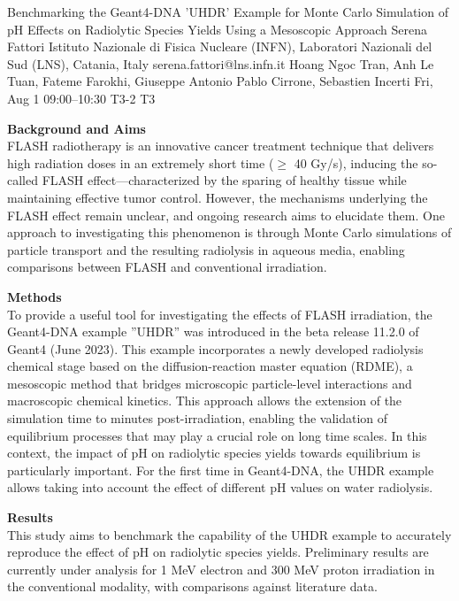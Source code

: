 \begin{talk}
  {Benchmarking the Geant4-DNA 'UHDR' Example for Monte Carlo Simulation of pH Effects on Radiolytic Species Yields Using a Mesoscopic Approach}%
  {Serena Fattori}%
  {Istituto Nazionale di Fisica Nucleare (INFN), Laboratori Nazionali del Sud (LNS), Catania, Italy}%
  {serena.fattori@lns.infn.it}%
  {Hoang Ngoc Tran, Anh Le Tuan, Fateme Farokhi, Giuseppe Antonio Pablo Cirrone, Sebastien Incerti}%
  {}%
  {Fri, Aug 1 09:00–10:30}%
  {T3-2}%
  {T3}%
  
				
			
\textbf{Background and Aims}\\
FLASH radiotherapy is an innovative cancer treatment technique that delivers high radiation doses in an extremely short time ($\geq$ 40 Gy/s), inducing the so-called FLASH effect—characterized by the sparing of healthy tissue while maintaining effective tumor control. However, the mechanisms underlying the FLASH effect remain unclear, and ongoing research aims to elucidate them. One approach to investigating this phenomenon is through Monte Carlo simulations of particle transport and the resulting radiolysis in aqueous media, enabling comparisons between FLASH and conventional irradiation.

\textbf{Methods}\\
To provide a useful tool for investigating the effects of FLASH irradiation, the Geant4-DNA example ''UHDR'' was introduced in the beta release 11.2.0 of Geant4 (June 2023). This example incorporates a newly developed radiolysis chemical stage based on the diffusion-reaction master equation (RDME), a mesoscopic method that bridges microscopic particle-level interactions and macroscopic chemical kinetics. This approach allows the extension of the simulation time to minutes post-irradiation, enabling the validation of equilibrium processes that may play a crucial role on long time scales. In this context, the impact of pH on radiolytic species yields towards equilibrium is particularly important. For the first time in Geant4-DNA, the UHDR example allows taking into account the effect of different pH values on water radiolysis.

\textbf{Results}\\
This study aims to benchmark the capability of the UHDR example to accurately reproduce the effect of pH on radiolytic species yields. Preliminary results are currently under analysis for 1 MeV electron and 300 MeV proton irradiation in the conventional modality, with comparisons against literature data.


\end{talk}
